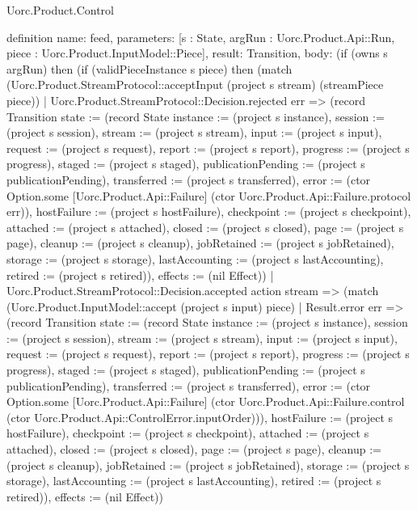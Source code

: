 \begin{lexlean}{Uorc.Product.Control}
\begin{semanticmodule}
definition{
  name: feed,
  parameters: [s : State, argRun : Uorc.Product.Api::Run, piece : Uorc.Product.InputModel::Piece],
  result: Transition,
  body: (if (owns s argRun) then (if (validPieceInstance s piece) then (match (Uorc.Product.StreamProtocol::acceptInput (project s stream) (streamPiece piece))
    | Uorc.Product.StreamProtocol::Decision.rejected err => (record Transition {state := (record State {instance := (project s instance), session := (project s session), stream := (project s stream), input := (project s input), request := (project s request), report := (project s report), progress := (project s progress), staged := (project s staged), publicationPending := (project s publicationPending), transferred := (project s transferred), error := (ctor Option.some [Uorc.Product.Api::Failure] (ctor Uorc.Product.Api::Failure.protocol err)), hostFailure := (project s hostFailure), checkpoint := (project s checkpoint), attached := (project s attached), closed := (project s closed), page := (project s page), cleanup := (project s cleanup), jobRetained := (project s jobRetained), storage := (project s storage), lastAccounting := (project s lastAccounting), retired := (project s retired)}), effects := (nil Effect)})
    | Uorc.Product.StreamProtocol::Decision.accepted action stream => (match (Uorc.Product.InputModel::accept (project s input) piece)
      | Result.error err => (record Transition {state := (record State {instance := (project s instance), session := (project s session), stream := (project s stream), input := (project s input), request := (project s request), report := (project s report), progress := (project s progress), staged := (project s staged), publicationPending := (project s publicationPending), transferred := (project s transferred), error := (ctor Option.some [Uorc.Product.Api::Failure] (ctor Uorc.Product.Api::Failure.control (ctor Uorc.Product.Api::ControlError.inputOrder))), hostFailure := (project s hostFailure), checkpoint := (project s checkpoint), attached := (project s attached), closed := (project s closed), page := (project s page), cleanup := (project s cleanup), jobRetained := (project s jobRetained), storage := (project s storage), lastAccounting := (project s lastAccounting), retired := (project s retired)}), effects := (nil Effect)})
}
\end{semanticmodule}
\end{lexlean}
